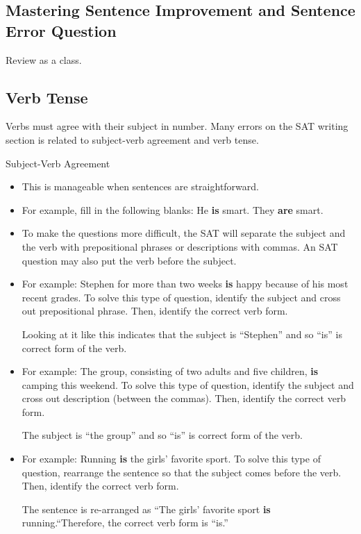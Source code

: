 \subsection{Mastering Sentence Improvement and Sentence Error Question}

Review as a class.

\subsection{Verb Tense}

Verbs must agree with their subject in number. Many errors on the SAT writing section is related to subject-verb agreement and verb tense.

Subject-Verb Agreement

\begin{itemize}
\item This is manageable when sentences are straightforward.
\item For example, fill in the following blanks: He \textbf{is} smart. They \textbf{are} smart.
\item To make the questions more difficult, the SAT will separate the subject and the verb with prepositional phrases or descriptions with commas. An SAT question may also put the verb before the subject.
\item For example: Stephen for more than two weeks \textbf{is} happy because of his most recent grades. To solve
this type of question, identify the subject and cross out prepositional phrase. Then, identify the correct verb form.

\bigskip
Looking at it like this indicates that the subject is ``Stephen'' and so ``is'' is correct form of the verb.

\item{For example: The group, consisting of two adults and five children, \textbf{is} camping this weekend. To solve this type of question, identify the subject and cross out description (between the commas). Then, identify the correct verb form.}

\bigskip
The subject is ``the group'' and so ``is'' is correct form of the verb.

\item For example: Running \textbf{is} the girls' favorite sport. To solve this type of question, rearrange the sentence so that the subject comes before the verb. Then, identify the correct verb form.

\bigskip
The sentence is re-arranged as ``The girls' favorite sport \textbf{is} running.``Therefore, the correct verb form is ``is.''
\end{itemize}

